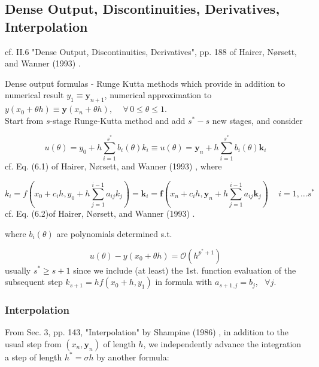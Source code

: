 \documentclass[10pt]{amsart}
\begin{document}
\begin{multicols*}{2}
\subsection{Dense Output, Discontinuities, Derivatives, Interpolation}

cf. II.6 "Dense Output, Discontinuities, Derivatives", pp. 188 of Hairer, N\o rsett, and Wanner (1993) \cite{HNW1993}.

Dense output formulas - Runge Kutta methods which provide in addition to numerical result $y_1 \equiv \mathbf{y}_{n+1}$, numerical approximation to $y(x_0 + \theta h) \equiv \mathbf{y}(x_n + \theta h), \quad \, \forall \, 0 \leq \theta \leq 1$. \\

Start from $s$-stage Runge-Kutta method and add $s^* - s$ new stages, and consider

\begin{equation}\label{Eq:DenseOutputGeneralApproximation}
	u(\theta) = y_0 + h \sum_{i = 1}^{s^*} b_i(\theta) k_i \equiv u(\theta) = \mathbf{y}_n + h \sum_{i=1}^{s^*} b_i(\theta) \mathbf{k}_i
\end{equation}
cf. Eq. (6.1) of Hairer, N\o rsett, and Wanner (1993) \cite{HNW1993}, where

\begin{equation}
	k_i = f(x_0 + c_i h, y_0 + h \sum_{j=1}^{i-1} a_{ij} k_j ) = \mathbf{k}_i = \mathbf{f}(x_n + c_i h, \mathbf{y}_n + h \sum_{j=1}^{i-1} a_{ij} \mathbf{k}_j) \quad \, i=1, \dots s^*
\end{equation}
cf. Eq. (6.2)of Hairer, N\o rsett, and Wanner (1993) \cite{HNW1993}.

where $b_i(\theta)$ are polynomials determined s.t. 

\begin{equation}
	u(\theta) - y(x_0 + \theta h) = \mathcal{O}(h^{p^* + 1})
\end{equation}
usually $s^* \geq s+1$ since we include (at least) the 1st. function evaluation of the subsequent step $k_{s+1} = hf(x_0 + h, y_1)$ in formula with $a_{s+1, j} = b_j$, \, $\forall j$.



\subsubsection{Interpolation}

From Sec. 3, pp. 143, "Interpolation" by Shampine (1986) \cite{Sham1986}, in addition to the usual step from $(x_n, \mathbf{y}_n)$ of length $h$, we independently advance the integration a step of length $h^* = \sigma h$ by another formula:


\end{multicols*}
\end{document}
